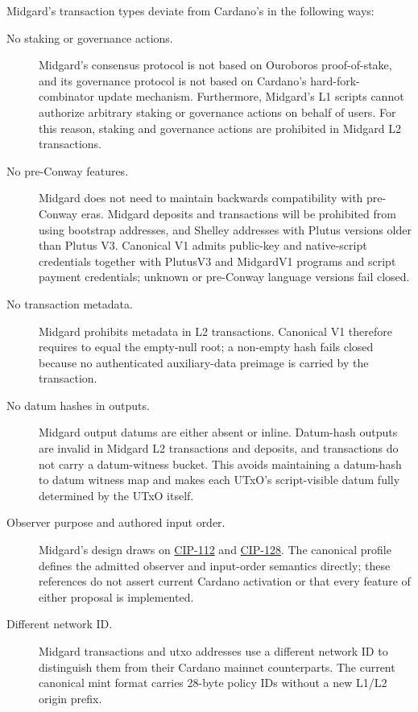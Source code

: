 \documentclass[../midgard.tex]{subfiles}
\begin{document}
Midgard's transaction types deviate from Cardano's in the following ways:
\begin{description}
    \item[No staking or governance actions.] Midgard's consensus protocol is not based on Ouroboros proof-of-stake, and its governance protocol is not based on Cardano's hard-fork-combinator update mechanism.
      Furthermore, Midgard's L1 scripts cannot authorize arbitrary staking or governance actions on behalf of users.
      For this reason, staking and governance actions are prohibited in Midgard L2 transactions.
    \item[No pre-Conway features.] Midgard does not need to maintain backwards compatibility with pre-Conway eras.
      Midgard deposits and transactions will be prohibited from using bootstrap addresses, and Shelley addresses with Plutus versions older than Plutus V3.
      Canonical V1 admits public-key and native-script credentials together
      with PlutusV3 and MidgardV1 programs and script payment credentials;
      unknown or pre-Conway language versions fail closed.
    \item[No transaction metadata.] Midgard prohibits metadata in L2
      transactions. Canonical V1 therefore requires
       to equal the empty-null root; a non-empty
      hash fails closed because no authenticated auxiliary-data preimage is
      carried by the transaction.
    \item[No datum hashes in outputs.] Midgard output datums are either absent or inline.
      Datum-hash outputs are invalid in Midgard L2 transactions and deposits, and transactions do not carry a datum-witness bucket.
      This avoids maintaining a datum-hash to datum witness map and makes each UTxO's script-visible datum fully determined by the UTxO itself.
    \item[Observer purpose and authored input order.] Midgard's design draws on \href{https://github.com/cardano-foundation/CIPs/tree/master/CIP-0112}{CIP-112} and \href{https://github.com/cardano-foundation/CIPs/tree/master/CIP-0128}{CIP-128}.
      The canonical profile defines the admitted observer and input-order semantics directly; these references do not assert current Cardano activation or that every feature of either proposal is implemented.
    \item[Different network ID.] Midgard transactions and utxo addresses use a different network ID to distinguish them from their Cardano mainnet counterparts.
      The current canonical mint format carries 28-byte policy IDs without a new L1/L2 origin prefix.

\end{description}
\end{document}
